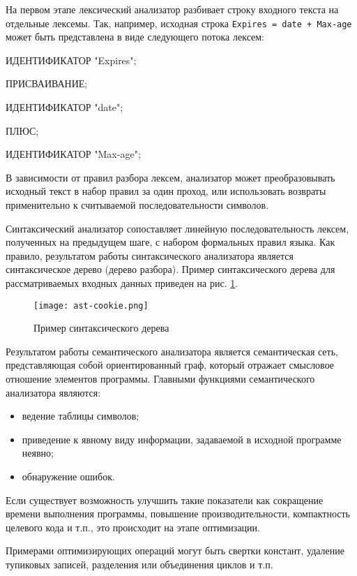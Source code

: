 На первом этапе лексический анализатор разбивает строку входного текста на отдельные лексемы. Так, например, исходная строка \lstinline|Expires = date + Max-age| может быть представлена в виде следующего потока лексем:

\begin{enumerate*}
	\item ИДЕНТИФИКАТОР "Expires";
	\item ПРИСВАИВАНИЕ;
	\item ИДЕНТИФИКАТОР "date";
	\item ПЛЮС;
	\item ИДЕНТИФИКАТОР "Max-age";
\end{enumerate*}

В зависимости от правил разбора лексем, анализатор может преобразовывать исходный текст в набор правил за один проход, или использовать возвраты применительно к считываемой последовательности символов.

Синтаксический анализатор сопоставляет линейную последовательность лексем, полученных на предыдущем шаге, с набором формальных правил языка. Как правило, результатом работы синтаксического анализатора является синтаксическое дерево (дерево разбора). Пример синтаксического дерева для рассматриваемых входных данных приведен на рис. \ref{fig:ast}.

\begin{figure}[htbp]
	\centering
	\texttt{[image: ast-cookie.png]}
	\caption{Пример синтаксического дерева}%
	\label{fig:ast}
\end{figure}

Результатом работы семантического анализатора является семантическая сеть, представляющая собой ориентированный граф, который отражает смысловое отношение элементов программы. Главными функциями семантического анализатора являются:

\begin{itemize}
	\item ведение таблицы символов;
	\item приведение к явному виду информации, задаваемой в исходной программе неявно;
	\item обнаружение ошибок.
\end{itemize}

Если существует возможность улучшить такие показатели как сокращение времени выполнения программы, повышение производительности, компактность целевого кода и т.п., это происходит на этапе оптимизации.

Примерами оптимизирующих операций могут быть свертки констант, удаление тупиковых записей, разделения или объединения циклов и т.п.

